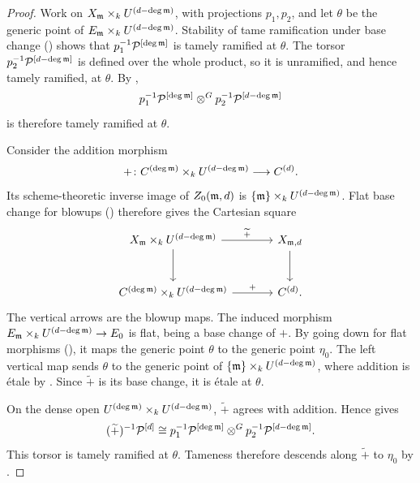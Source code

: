 \begin{proof}
Work on $X_{\mathfrak{m}}\times_k U^{(d-\deg\mathfrak{m})}$, with projections $p_1,p_2$,
and let $\theta$ be the generic point of
$E_{\mathfrak{m}}\times_k U^{(d-\deg\mathfrak{m})}$. Stability of tame ramification
under base change () shows that
$p_1^{-1}\mathcal{P}^{[\deg\mathfrak{m}]}$ is tamely ramified at $\theta$. The torsor
$p_2^{-1}\mathcal{P}^{[d-\deg\mathfrak{m}]}$ is defined over the whole product, so it is
unramified, and hence tamely ramified, at $\theta$. By
,
\[
p_1^{-1}\mathcal{P}^{[\deg\mathfrak{m}]}
  \otimes^G p_2^{-1}\mathcal{P}^{[d-\deg\mathfrak{m}]}
\]
is therefore tamely ramified at $\theta$.

Consider the addition morphism
\[
+\colon C^{(\deg\mathfrak{m})}\times_k U^{(d-\deg\mathfrak{m})}\longrightarrow C^{(d)}.
\]
Its scheme-theoretic inverse image of $Z_0(\mathfrak{m},d)$ is
$\{\mathfrak{m}\}\times_k U^{(d-\deg\mathfrak{m})}$. Flat base change for blowups
() therefore gives the Cartesian
square
\[
\begin{tikzcd}[column sep=large,row sep=large]
X_{\mdls}\times_k U^{(d-\deg\mdls)}
  \arrow[r,"\widetilde{+}"] \arrow[d]
  & X_{\mdls,d} \arrow[d] \\
C^{(\deg\mdls)}\times_k U^{(d-\deg\mdls)}
  \arrow[r,"+"]
  & C^{(d)}.
\end{tikzcd}
\]
The vertical arrows are the blowup maps.
The induced morphism
$E_{\mathfrak{m}}\times_k U^{(d-\deg\mathfrak{m})}\to E_0$ is flat, being a base
change of $+$. By going down for flat morphisms (), it
maps the generic point $\theta$ to the generic point $\eta_0$.
The left vertical map sends $\theta$ to the generic point of
$\{\mathfrak{m}\}\times_k U^{(d-\deg\mathfrak{m})}$, where addition is étale by
. Since $\widetilde{+}$ is its base
change, it is étale at $\theta$.

On the dense open $U^{(\deg\mathfrak{m})}\times_k U^{(d-\deg\mathfrak{m})}$,
$\widetilde{+}$ agrees with addition. Hence
 gives
\[
(\widetilde{+})^{-1}\mathcal{P}^{[d]}\cong
p_1^{-1}\mathcal{P}^{[\deg\mathfrak{m}]}
  \otimes^G p_2^{-1}\mathcal{P}^{[d-\deg\mathfrak{m}]}.
\]
This torsor is tamely ramified at $\theta$. Tameness therefore descends
along $\widetilde{+}$ to $\eta_0$ by
.
\end{proof}


